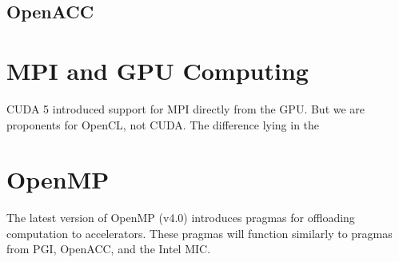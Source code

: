 \documentclass{report}
\begin{document}
\subsection{OpenACC}




\section{MPI and GPU Computing}

CUDA 5 introduced support for MPI directly from the GPU. But we are proponents for OpenCL, not CUDA. The difference lying in the 


\section{OpenMP}
The latest version of OpenMP (v4.0) introduces pragmas for offloading computation to accelerators. These pragmas will function similarly to pragmas from PGI, OpenACC, and the Intel MIC. 

\ifstandalone


\end{document}
